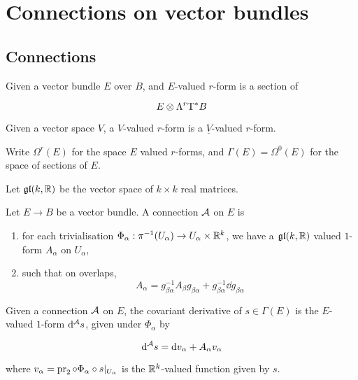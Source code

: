 \section{Connections on vector bundles}

\subsection{Connections}

\begin{definition}
     Given a vector bundle \(E\) over \(B\), and \(E\)-valued \(r\)-form is a section of

    \[E \otimes \Lambda^r \mathrm{T}^* B\]
\end{definition}

\begin{definition}

    Given a vector space \(V\), a \(V\)-valued \(r\)-form is a \(\underline V\)-valued \(r\)-form.
\end{definition}

\begin{notation}
    Write \(\Omega^r(E)\) for the space \(E\) valued \(r\)-forms, and \(\Gamma(E) = \Omega^0(E)\) for the space of sections of \(E\). 
\end{notation}

\begin{notation}
    Let \(\mathfrak{g}\mathfrak{l}(k, \mathbb{R})\) be the vector space of \(k\times k\) real matrices.
\end{notation}

\begin{definition}
    [connection] Let \(E \to B\) be a vector bundle. A connection \(\mathcal{A}\) on \(E\) is
    \begin{enumerate}
        \item for each trivialisation \(\Phi_\alpha : \pi^{-1}(U_\alpha) \to U_\alpha \times \mathbb{R}^k\), we have a \(\mathfrak{g}\mathfrak{l}(k, \mathbb{R})\) valued \(1\)-form \(A_\alpha\) on \(U_\alpha\),
        \item such that on overlaps,
        \[A_\alpha = g_{\beta\alpha}^{-1}A_\beta g_{\beta\alpha} + g_{\beta\alpha}^{-1}\dd g_{\beta\alpha}\]
    \end{enumerate}
\end{definition}

\begin{definition}

    Given a connection \(\mathcal{A}\) on \(E\), the covariant derivative of \(s \in \Gamma(E)\) is the \(E\)-valued \(1\)-form \(\dd^{\mathcal{A}} s\), given under \(\Phi_\alpha\) by

    \[\dd^{\mathcal{A}} s = \dd v_\alpha + A_\alpha v_\alpha\]

    where \(v_\alpha = \operatorname{pr}_2 \circ \Phi_\alpha \circ s\vert_{U_\alpha}\) is the \(\mathbb{R}^k\)-valued function given by \(s\).
\end{definition}

